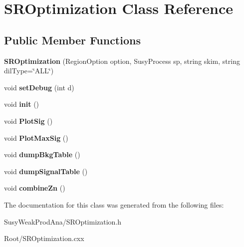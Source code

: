 \hypertarget{classSROptimization}{
\section{SROptimization Class Reference}
\label{classSROptimization}
}
\subsection*{Public Member Functions}
\begin{DoxyCompactItemize}
\item 
\hypertarget{classSROptimization_a272576b1a7c21e8292e255da28d74185}{
{\bfseries SROptimization} (RegionOption option, SusyProcess sp, string skim, string dilType=\char`\"{}ALL\char`\"{})}
\label{classSROptimization_a272576b1a7c21e8292e255da28d74185}

\item 
\hypertarget{classSROptimization_a68dc648f509c7e69aa84db765ae97e9d}{
void {\bfseries setDebug} (int d)}
\label{classSROptimization_a68dc648f509c7e69aa84db765ae97e9d}

\item 
\hypertarget{classSROptimization_ad7ae794f3337548c86580d7f8cfb204e}{
void {\bfseries init} ()}
\label{classSROptimization_ad7ae794f3337548c86580d7f8cfb204e}

\item 
\hypertarget{classSROptimization_a801db8bf09ddba833864e595e7e1c189}{
void {\bfseries PlotSig} ()}
\label{classSROptimization_a801db8bf09ddba833864e595e7e1c189}

\item 
\hypertarget{classSROptimization_aaeece2802ac00819357d520954c77f72}{
void {\bfseries PlotMaxSig} ()}
\label{classSROptimization_aaeece2802ac00819357d520954c77f72}

\item 
\hypertarget{classSROptimization_aff182e4ed79b8b9f85d668c6a0333bfe}{
void {\bfseries dumpBkgTable} ()}
\label{classSROptimization_aff182e4ed79b8b9f85d668c6a0333bfe}

\item 
\hypertarget{classSROptimization_aa735b2b43492fccef287a09fa79c11ca}{
void {\bfseries dumpSignalTable} ()}
\label{classSROptimization_aa735b2b43492fccef287a09fa79c11ca}

\item 
\hypertarget{classSROptimization_a4b5f3e94d487d12c091e0369461d0c12}{
void {\bfseries combineZn} ()}
\label{classSROptimization_a4b5f3e94d487d12c091e0369461d0c12}

\end{DoxyCompactItemize}


The documentation for this class was generated from the following files:\begin{DoxyCompactItemize}
\item 
SusyWeakProdAna/SROptimization.h\item 
Root/SROptimization.cxx\end{DoxyCompactItemize}
